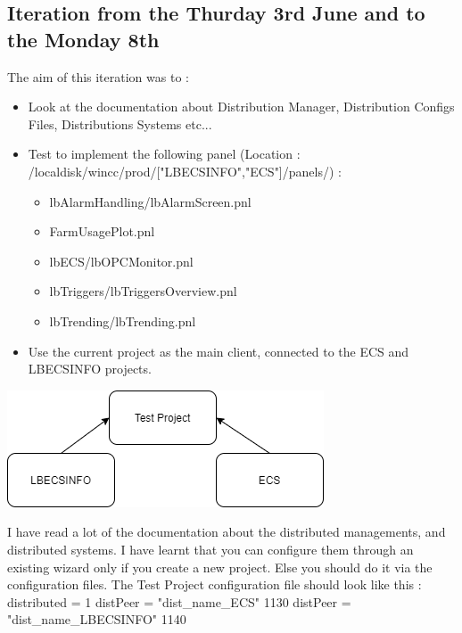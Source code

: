 \documentclass[a4paper, 12pt]{article}
\begin{document}
\subsection{Iteration from the Thurday 3rd June and to the Monday 8th}
The aim of this iteration was to :
\begin{itemize}
    \item Look at the documentation about Distribution Manager, Distribution Configs Files, Distributions Systems etc...
    \item Test to implement the following panel (Location : /localdisk/wincc/prod/["LBECSINFO","ECS"]/panels/) : 
    \begin{itemize}
        \item lbAlarmHandling/lbAlarmScreen.pnl
        \item FarmUsagePlot.pnl
        \item lbECS/lbOPCMonitor.pnl
        \item lbTriggers/lbTriggersOverview.pnl
        \item lbTrending/lbTrending.pnl
    \end{itemize}
    \item Use the current project as the main client, connected to the ECS and LBECSINFO projects.
\end{itemize}
\begin{center}
    \includegraphics[scale = 0.5]{images/subsystem.png}
\end{center}
I have read a lot of the documentation about the distributed managements, and distributed systems.  I have learnt that you can configure them through an existing wizard only if you create a new project. Else you should do it via the configuration files. The Test Project configuration file should look like this :\newline
[general]\newline
distributed = 1\newline
[dist]\newline
distPeer = "dist\_name\_ECS" 1130\newline
distPeer = "dist\_name\_LBECSINFO" 1140\newline
\end{document}
